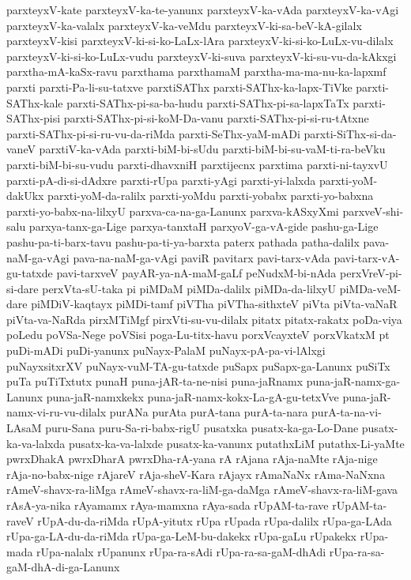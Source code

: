 {parxteyxV-kate
parxteyxV-ka-te-yanunx
parxteyxV-ka-vAda
parxteyxV-ka-vAgi
parxteyxV-ka-valalx
parxteyxV-ka-veMdu
parxteyxV-ki-sa-beV-kA-gilalx
parxteyxV-kisi
parxteyxV-ki-si-ko-LaLx-lAra
parxteyxV-ki-si-ko-LuLx-vu-dilalx
parxteyxV-ki-si-ko-LuLx-vudu
parxteyxV-ki-suva
parxteyxV-ki-su-vu-da-kAkxgi
parxtha-mA-kaSx-ravu
parxthama
parxthamaM
parxtha-ma-ma-nu-ka-lapxmf
parxti
parxti-Pa-li-su-tatxve
parxtiSAThx
parxti-SAThx-ka-lapx-TiVke
parxti-SAThx-kale
parxti-SAThx-pi-sa-ba-hudu
parxti-SAThx-pi-sa-lapxTaTx
parxti-SAThx-pisi
parxti-SAThx-pi-si-koM-Da-vanu
parxti-SAThx-pi-si-ru-tAtxne
parxti-SAThx-pi-si-ru-vu-da-riMda
parxti-SeThx-yaM-mADi
parxti-SiThx-si-da-vaneV
parxtiV-ka-vAda
parxti-biM-bi-sUdu
parxti-biM-bi-su-vaM-ti-ra-beVku
parxti-biM-bi-su-vudu
parxti-dhavxniH
parxtijecnx
parxtima
parxti-ni-tayxvU
parxti-pA-di-si-dAdxre
parxti-rUpa
parxti-yAgi
parxti-yi-lalxda
parxti-yoM-dakUkx
parxti-yoM-da-ralilx
parxti-yoMdu
parxti-yobabx
parxti-yo-babxna
parxti-yo-babx-na-lilxyU
parxva-ca-na-ga-Lanunx
parxva-kASxyXmi
parxveV-shi-salu
parxya-tanx-ga-Lige
parxya-tanxtaH
parxyoV-ga-vA-gide
pashu-ga-Lige
pashu-pa-ti-barx-tavu
pashu-pa-ti-ya-barxta
paterx
pathada
patha-dalilx
pava-naM-ga-vAgi
pava-na-naM-ga-vAgi
paviR
pavitarx
pavi-tarx-vAda
pavi-tarx-vA-gu-tatxde
pavi-tarxveV
payAR-ya-nA-maM-gaLf
peNudxM-bi-nAda
perxVreV-pi-si-dare
perxVta-sU-taka
pi
piMDaM
piMDa-dalilx
piMDa-da-lilxyU
piMDa-veM-dare
piMDiV-kaqtayx
piMDi-tamf
piVTha
piVTha-sithxteV
piVta
piVta-vaNaR
piVta-va-NaRda
pirxMTiMgf
pirxVti-su-vu-dilalx
pitatx
pitatx-rakatx
poDa-viya
poLedu
poVSa-Nege
poVSisi
poga-Lu-titx-havu
porxVcayxteV
porxVkatxM
pt
puDi-mADi
puDi-yanunx
puNayx-PalaM
puNayx-pA-pa-vi-lAlxgi
puNayxsitxrXV
puNayx-vuM-TA-gu-tatxde
puSapx
puSapx-ga-Lanunx
puSiTx
puTa
puTiTxtutx
punaH
puna-jAR-ta-ne-nisi
puna-jaRnamx
puna-jaR-namx-ga-Lanunx
puna-jaR-namxkekx
puna-jaR-namx-kokx-La-gA-gu-tetxVve
puna-jaR-namx-vi-ru-vu-dilalx
purANa
purAta
purA-tana
purA-ta-nara
purA-ta-na-vi-LAsaM
puru-Sana
puru-Sa-ri-babx-rigU
pusatxka
pusatx-ka-ga-Lo-Dane
pusatx-ka-va-lalxda
pusatx-ka-va-lalxde
pusatx-ka-vanunx
putathxLiM
putathx-Li-yaMte
pwrxDhakA
pwrxDharA
pwrxDha-rA-yana
rA
rAjana
rAja-naMte
rAja-nige
rAja-no-babx-nige
rAjareV
rAja-sheV-Kara
rAjayx
rAmaNaNx
rAma-NaNxna
rAmeV-shavx-ra-liMga
rAmeV-shavx-ra-liM-ga-daMga
rAmeV-shavx-ra-liM-gava
rAsA-ya-nika
rAyamamx
rAya-mamxna
rAya-sada
rUpAM-ta-rave
rUpAM-ta-raveV
rUpA-du-da-riMda
rUpA-yitutx
rUpa
rUpada
rUpa-dalilx
rUpa-ga-LAda
rUpa-ga-LA-du-da-riMda
rUpa-ga-LeM-bu-dakekx
rUpa-gaLu
rUpakekx
rUpa-mada
rUpa-nalalx
rUpanunx
rUpa-ra-sAdi
rUpa-ra-sa-gaM-dhAdi
rUpa-ra-sa-gaM-dhA-di-ga-Lanunx
}
